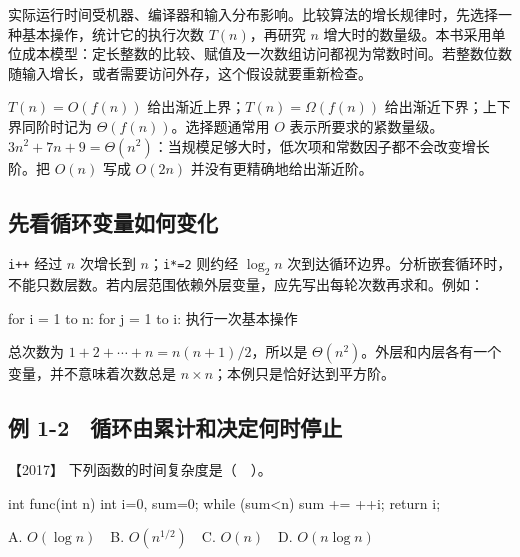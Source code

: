实际运行时间受机器、编译器和输入分布影响。比较算法的增长规律时，先选择一种基本操作，统计它的执行次数 \(T(n)\)，再研究 \(n\) 增大时的数量级。本书采用单位成本模型：定长整数的比较、赋值及一次数组访问都视为常数时间。若整数位数随输入增长，或者需要访问外存，这个假设就要重新检查。

\(T(n)=O(f(n))\) 给出渐近上界；\(T(n)=\Omega(f(n))\) 给出渐近下界；上下界同阶时记为 \(\Theta(f(n))\)。选择题通常用 \(O\) 表示所要求的紧数量级。\(3n^2+7n+9=\Theta(n^2)\)：当规模足够大时，低次项和常数因子都不会改变增长阶。把 \(O(n)\) 写成 \(O(2n)\) 并没有更精确地给出渐近阶。

\subsection{先看循环变量如何变化}\label{DS01-detail1}

\texttt{i+\allowbreak{}+\allowbreak{}} 经过 \(n\) 次增长到 \(n\)；\texttt{i*\allowbreak{}=\allowbreak{}2} 则约经 \(\log_2n\) 次到达循环边界。分析嵌套循环时，不能只数层数。若内层范围依赖外层变量，应先写出每轮次数再求和。例如：

\par\medskip\noindent\begin{minipage}{\linewidth}
\begin{codeblock}[language={}]
for i = 1 to n:
    for j = 1 to i:
        执行一次基本操作
\end{codeblock}
\end{minipage}\par\medskip

总次数为 \(1+2+\cdots+n=n(n+1)/2\)，所以是 \(\Theta(n^2)\)。外层和内层各有一个变量，并不意味着次数总是 \(n\times n\)；本例只是恰好达到平方阶。

\subsection{例 1-2　循环由累计和决定何时停止}\label{DS01-ex2}

\begin{example}[配套例题]

【2017】 下列函数的时间复杂度是（　）。

\par\medskip\noindent\begin{minipage}{\linewidth}
\begin{codeblock}[language=C]
int func(int n) {
    int i=0, sum=0;
    while (sum<n) sum += ++i;
    return i;
}
\end{codeblock}
\end{minipage}\par\medskip

A. \(O(\log n)\)　B. \(O(n^{1/2})\)　C. \(O(n)\)　D. \(O(n\log n)\)

\end{example}

